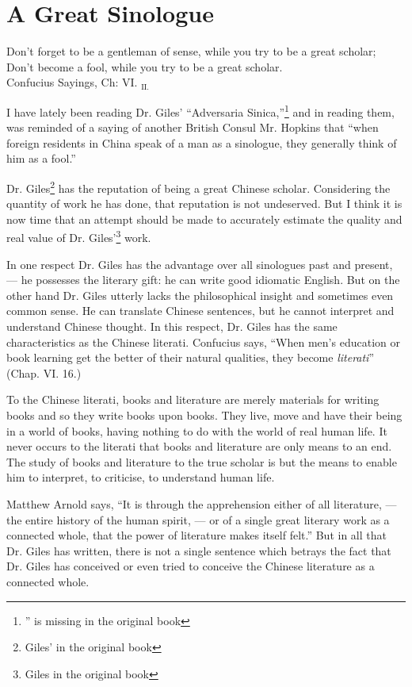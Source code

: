 \chapter{A Great Sinologue}
\begin{center}
    \scriptsize Don't forget to be a gentleman of sense, while you try to be a great scholar; \\ Don't become a fool, while you try to be a great scholar. \\
    \hfill Confucius Sayings, Ch: VI. $_{\text{II}.}$
\end{center}

I have lately been reading Dr. Giles' ``Adversaria Sinica,''\footnote{'' is missing in the original book} and in reading them, was reminded of a saying of another British Consul Mr. Hopkins that ``when foreign residents in China speak of a man as a sinologue, they generally think of him as a fool.''

Dr. Giles\footnote{Giles' in the original book} has the reputation of being a great Chinese scholar.
Considering the quantity of work he has done, that reputation is not undeserved.
But I think it is now time that an attempt should be made to accurately estimate the quality and real value of Dr. Giles'\footnote{Giles in the original book} work.

In one respect Dr. Giles has the advantage over all sinologues past and present, --- he possesses the literary gift: he can write good idiomatic English.
But on the other hand Dr. Giles utterly lacks the philosophical insight and sometimes even common sense.
He can translate Chinese sentences, but he cannot interpret and understand Chinese thought.
In this respect, Dr. Giles has the same characteristics as the Chinese literati.
Confucius says, ``When men's education or book learning get the better of their natural qualities, they become \emph{literati}'' (Chap. VI. 16.)

To the Chinese literati, books and literature are merely materials for writing books and so they write books upon books.
They live, move and have their being in a world of books, having nothing to do with the world of real human life.
It never occurs to the literati that books and literature are only means to an end.
The study of books and literature to the true scholar is but the means to enable him to interpret, to criticise, to understand human life.

Matthew Arnold says, ``It is through the apprehension either of all literature, --- the entire history of the human spirit, --- or of a single great literary work as a connected whole, that the power of literature makes itself felt.''
But in all that Dr. Giles has written, there is not a single sentence which betrays the fact that Dr. Giles has conceived or even tried to conceive the Chinese literature as a connected whole.

